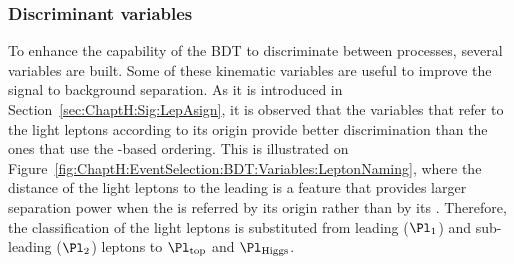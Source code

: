 \subsubsection{Discriminant variables}
\label{sec:ChaptH:EventSelection:BDT:Variables}

To enhance the capability of the BDT to discriminate between processes, several variables are built. %
Some of these kinematic variables are useful to improve the signal to background separation. 
As it is introduced in Section~\ref{sec:ChaptH:Sig:LepAsign}, it is observed that the variables that refer to the light leptons according
to its origin provide better discrimination than the ones that use the \pT-based ordering.
This is illustrated on Figure~\ref{fig:ChaptH:EventSelection:BDT:Variables:LeptonNaming}, where
the distance of the light leptons to the leading \bjet is a feature that provides larger separation power when the \emu is referred 
by its origin rather than by its \pT.
Therefore, the classification of the light leptons is substituted from leading 
($\Pl_{\text{1}}$) and sub-leading ($\Pl_{\text{2}}$) leptons to $\Pl_{\text{top}}$ and $\Pl_{\text{Higgs}}$. 

